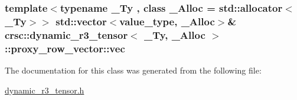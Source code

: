 \subsubsection[{\texorpdfstring{vec}{vec}}]{\setlength{\rightskip}{0pt plus 5cm}template$<$typename \+\_\+\+Ty , class \+\_\+\+Alloc  = std\+::allocator$<$\+\_\+\+Ty$>$$>$ std\+::vector$<${\bf value\+\_\+type}, \+\_\+\+Alloc$>$\& {\bf crsc\+::dynamic\+\_\+r3\+\_\+tensor}$<$ \+\_\+\+Ty, \+\_\+\+Alloc $>$\+::proxy\+\_\+row\+\_\+vector\+::vec\hspace{0.3cm}{\ttfamily [private]}}\hypertarget{classcrsc_1_1dynamic__r3__tensor_1_1proxy__row__vector_a18cf96be074c31c45fd2dfbeb3a2272c}{}\label{classcrsc_1_1dynamic__r3__tensor_1_1proxy__row__vector_a18cf96be074c31c45fd2dfbeb3a2272c}


The documentation for this class was generated from the following file\+:\begin{DoxyCompactItemize}
\item 
\hyperlink{dynamic__r3__tensor_8h}{dynamic\+\_\+r3\+\_\+tensor.\+h}\end{DoxyCompactItemize}
